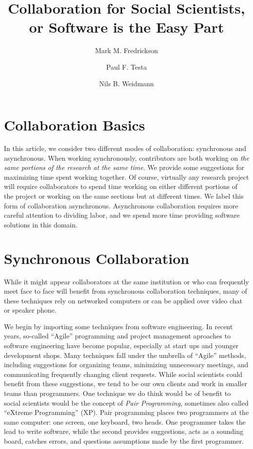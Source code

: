 \documentclass[]{article}
\author{Mark M. Fredrickson \and Paul F. Testa \and Nils B. Weidmann} %
\title{Collaboration for Social Scientists, or Software is the Easy Part}
\begin{document}
\maketitle
\section{Collaboration Basics}


In this article, we consider two different modes of collaboration: synchronous
and asynchronous. When working synchronously, contributors are both working on
\emph{the same portions of the research at the same time}. We provide some
suggestions for maximizing time spent working together. Of course, virtually
any research project will require collaborators to spend time working on
either different portions of the project or working on the same sections but
at different times. We label this form of collaboration asynchronous.
Asynchronous collaboration requires more careful attention to dividing labor,
and we spend more time providing software solutions in this domain.

\section{Synchronous Collaboration}

While it might appear collaborators at the same institution or who can
frequently meet face to face will benefit from synchronous collaboration
techniques, many of these techniques rely on networked computers or can be
applied over video chat or speaker phone.

We begin by importing some techniques from software engineering. In recent
years, so-called ``Agile'' programming and project management aproaches to
software engineering have become popular, especially at start ups and younger
development shops. Many techniques fall under the umbrella of ``Agile''
methods, including suggestions for organizing teams, minimizing unnecessary
meetings, and communicating frequently changing client requests. While social
scientists could benefit from these suggestions, we tend to be our own clients
and work in smaller teams than programmers. One technique we do think would be
of benefit to social scientists would be the concept of \emph{Pair
Programming,} sometimes also called ``eXtreme Programming'' (XP). Pair
programming places two programmers at the same computer: one screen, one
keyboard, two heads. One programmer takes the lead to write software, while
the second provides suggestions, acts as a sounding board, catches errors, and
questions assumptions made by the first programmer. 
\end{document}
